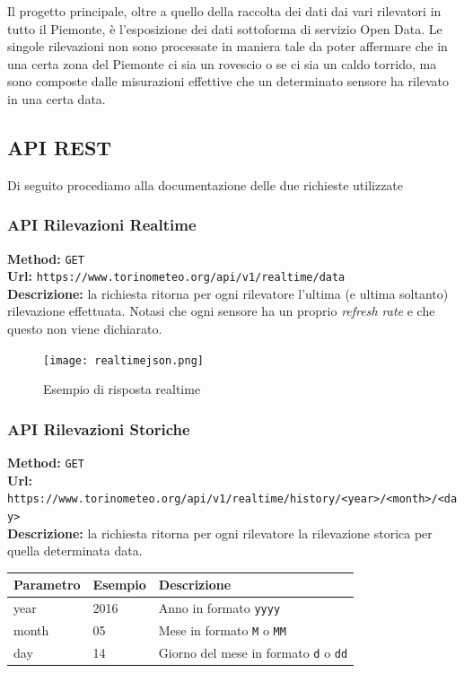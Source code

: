 Il progetto principale, oltre a quello della raccolta dei dati dai vari rilevatori in tutto il Piemonte, è
l'esposizione dei dati sottoforma di servizio Open Data. Le singole rilevazioni non sono processate
in maniera tale da poter affermare che in una certa zona del Piemonte ci sia un rovescio o se ci sia
un caldo torrido, ma sono composte dalle misurazioni effettive che un determinato sensore ha rilevato
in una certa data.

\subsection{API REST}
Di seguito procediamo alla documentazione delle due richieste utilizzate

\subsubsection{API Rilevazioni Realtime}
\textbf{Method:} \texttt{GET} \\
\textbf{Url:} \texttt{https://www.torinometeo.org/api/v1/realtime/data} \\

\noindent\textbf{Descrizione:} la richiesta ritorna per ogni rilevatore l'ultima (e ultima soltanto)
rilevazione effettuata. Notasi che ogni sensore ha un proprio \emph{refresh rate} e che questo non viene
dichiarato.

\begin{figure}[H]
\centering
\texttt{[image: realtimejson.png]}
\caption*{Esempio di risposta realtime}
\label{fig:realtimejson}
\end{figure}


\subsubsection{API Rilevazioni Storiche}
\textbf{Method:} \texttt{GET} \\
\textbf{Url:} \texttt{https://www.torinometeo.org/api/v1/realtime/history/<year>/<month>/<day>} \\

\noindent\textbf{Descrizione:} la richiesta ritorna per ogni rilevatore la rilevazione storica per quella
determinata data.

\begin{table}[h]
\centering
\begin{tabular}{|l|l|l|}
\hline
\rowcolor[HTML]{3166FF} 
{\color[HTML]{FFFFFF} \textbf{Parametro}} & {\color[HTML]{FFFFFF} \textbf{Esempio}} & {\color[HTML]{FFFFFF} \textbf{Descrizione}}                           \\ \hline
year                                 & 2016                      & Anno in formato \texttt{yyyy} \\ \hline
month                                 & 05                      & Mese in formato \texttt{M} o \texttt{MM}    \\ \hline
day                                 & 14                      & Giorno del mese in formato \texttt{d} o \texttt{dd}    \\ \hline
\end{tabular}%

\end{table}


